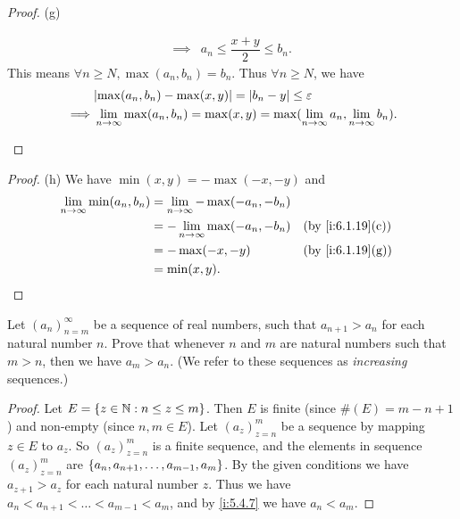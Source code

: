 \begin{proof}{(g)}
\begin{itemize}
\begin{align*}
            \implies & a_n \leq \dfrac{x + y}{2} \leq b_n.
          \end{align*}
          This means \(\forall n \geq N, \max(a_n, b_n) = b_n\).
          Thus \(\forall n \geq N\), we have
          \begin{align*}
                     & \abs{\max(a_n, b_n) - \max(x, y)} = \abs{b_n - y} \leq \varepsilon                                        \\
            \implies & \lim_{n \to \infty} \max(a_n, b_n) = \max(x, y) = \max(\lim_{n \to \infty} a_n, \lim_{n \to \infty} b_n).
          \end{align*}
  \end{itemize}
\end{proof}

\begin{proof}{(h)}
  We have \(\min(x, y) = -\max(-x, -y)\) and
  \begin{align*}
    \lim_{n \to \infty} \min(a_n, b_n) & = \lim_{n \to \infty} -\max(-a_n, -b_n)                       \\
                                       & = -\lim_{n \to \infty} \max(-a_n, -b_n) &  & \by{i:6.1.19}[c] \\
                                       & = -\max(-x, -y)                         &  & \by{i:6.1.19}[g] \\
                                       & = \min(x, y).
  \end{align*}
\end{proof}

\exercisesection

\begin{ex}\label{i:ex:6.1.1}
  Let \((a_n)_{n = m}^\infty\) be a sequence of real numbers, such that \(a_{n + 1} > a_n\) for each natural number \(n\).
  Prove that whenever \(n\) and \(m\) are natural numbers such that \(m > n\), then we have \(a_m > a_n\).
  (We refer to these sequences as \emph{increasing} sequences.)
\end{ex}

\begin{proof}
  Let \(E = \left\lbrace z \in \mathbb{N} : n \leq z \leq m\right\rbrace\).
  Then \(E\) is finite (since \(\#(E) = m - n + 1\)) and non-empty (since \(n, m \in E\)).
  Let \((a_z)_{z = n}^m\) be a sequence by mapping \(z \in E\) to \(a_z\).
  So \((a_z)_{z = n}^m\) is a finite sequence, and the elements in sequence \((a_z)_{z = n}^m\) are \(\left\lbrace a_n, a_{n + 1}, \dots, a_{m - 1}, a_m\right\rbrace\).
  By the given conditions we have \(a_{z + 1} > a_z\) for each natural number \(z\).
  Thus we have \(a_n < a_{n + 1} < \dots < a_{m - 1} < a_m\), and by \cref{i:5.4.7} we have \(a_n < a_m\).
\end{proof}

